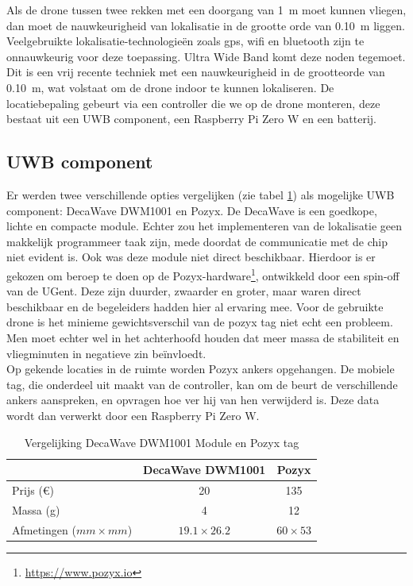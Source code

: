 Als de drone tussen twee rekken met een doorgang van \SI{1}{\m} moet kunnen vliegen, dan moet de nauwkeurigheid van lokalisatie in de grootte orde van \SI{0.10}{\m} liggen. Veelgebruikte lokalisatie-technologie\"en zoals gps, wifi en bluetooth zijn te onnauwkeurig voor deze toepassing. Ultra Wide Band komt deze noden tegemoet. Dit is een vrij recente techniek met een nauwkeurigheid in de grootteorde van \SI{0.10}{\m}, wat volstaat om de drone indoor te kunnen lokaliseren. De locatiebepaling gebeurt via een controller die we op de drone monteren, deze bestaat uit een UWB component, een Raspberry Pi Zero W en een batterij. \\ 

\subsection{UWB component} \label{sec:uwb}
Er werden twee verschillende opties vergelijken (zie tabel \ref{tab:decavspozyx}) als mogelijke UWB component: DecaWave DWM1001 en Pozyx. De DecaWave is een goedkope, lichte en compacte module. Echter zou het implementeren van de lokalisatie geen makkelijk programmeer taak zijn, mede doordat de communicatie met de chip niet evident is. Ook was deze module niet direct beschikbaar. Hierdoor is er gekozen om beroep te doen op de Pozyx-hardware\footnote{\url{https://www.pozyx.io}}, ontwikkeld door een spin-off van de UGent. Deze zijn duurder, zwaarder en groter, maar waren direct beschikbaar en de begeleiders hadden hier al ervaring mee. Voor de gebruikte drone is het minieme gewichtsverschil van de pozyx tag niet echt een probleem. Men moet echter wel in het achterhoofd houden dat meer massa de stabiliteit en vliegminuten in negatieve zin be\"invloedt.\\

Op gekende locaties in de ruimte worden Pozyx ankers opgehangen. De mobiele tag, die onderdeel uit maakt van de controller, kan om de beurt de verschillende ankers aanspreken, en opvragen hoe ver hij van hen verwijderd is. Deze data wordt dan verwerkt door een Raspberry Pi Zero W. \\

\begin{table}[p]
	\centering
	\begin{tabular}{ | l | c | c | } \hline
		& DecaWave DWM1001 & Pozyx \\
		\hline 
		\hline
		Prijs (\euro{}) & 20 & 135 \\ 
		\hline
		Massa (g) & 4 & 12 \\ 
		\hline
		Afmetingen ($mm \times mm$) & $19.1 \times 26.2$ & $60 \times 53$ \\ 
		\hline
	\end{tabular}
	\caption[Vergelijking DecaWave DWM1001 Module en Pozyx tag]{Vergelijking DecaWave DWM1001 Module en Pozyx tag}
	\label{tab:decavspozyx}
\end{table}

